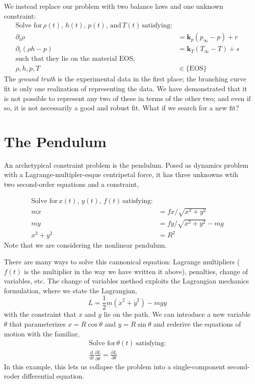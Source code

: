\documentclass[]{article}
\begin{document}
We instead replace our problem with two balance laws and one unknown
constraint:
\begin{align}
\text{Solve for}\, \rho(t), \, h(t), \, p(t),\, \text{and}\, T(t)\, \text{satisfying:}\\
\partial_t \rho &  = \mathbf{k}_p(p_\infty - p) + r\\
\partial_t (\rho h-p) & = \mathbf{k}_T(T_\infty-T) + s \\
\text{such that they lie on the material EOS,}\\
\rho,h,p,T & \in \{\text{EOS}\}
\end{align}
The \emph{ground truth} is the experimental data in the first place; the
branching curve fit is only one realization of representing the data. We
have demonstrated that it is not possible to represent any two of these
in terms of the other two; and even if so, it is not necessarily a good
and robust fit. What if we search for a new fit?

\hypertarget{header-n3267}{%
\section{The Pendulum}\label{header-n3267}}

An archetypical constraint problem is the pendulum. Posed as dynamics
problem with a Lagrange-multipler-esque centripetal force, it
has three unknowns wtih two second-order equations and a constraint,

\begin{align}
\text{Solve for}\, x(t), \, y(t), \, f(t) \, \text{satisfying:} \\
m \ddot{x} & = f x/\sqrt{x^2+y^2} \\
m \ddot{y} & = f y/\sqrt{x^2+y^2} - m g \\
x^2 + y^2 & = R^2
\end{align}
Note that we are considering the nonlinear pendulum.

There are many ways to solve this cannonical equation: Lagrange
multipliers (\(f(t)\) is the multiplier in the way we have written it
above), penalties, change of variables, etc. The change of variables
method exploits the Lagrangian mechanics formulation, where we state
the Lagrangian,
\begin{equation}
L = \frac{1}{2}m\left(\dot{x}^2 + \dot{y}^2\right) - m g y
\end{equation}
with the constraint that \(x\) and \(y\) lie on the path.
We can introduce a new variable \(\theta\) that parameterizes
\(x=R\cos\theta\) and \(y=R\sin\theta\) and rederive the equations of
motion with the familiar,
\begin{align}
\text{Solve for}\, \theta(t) \ \text{satisfying:} \\
\frac{\mathrm{d}}{\mathrm{d}t} \frac{\partial L}{\partial
  \dot{\theta}} =
  \frac{\partial L}{\partial \theta}
\end{align}
In this example, this lets us collapse the problem into a
single-component second-roder differential equation.
\end{document}
